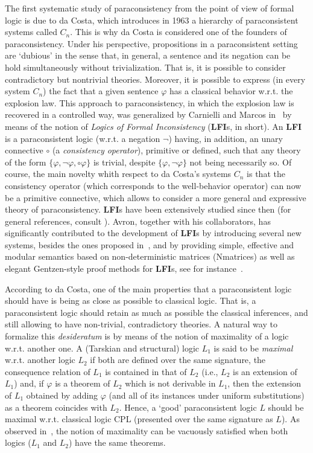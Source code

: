 \documentclass{article}
\theoremstyle{definition}
\begin{document}
The first systematic study of paraconsistency from the point of view of formal logic is due to da Costa, which introduces in 1963 a hierarchy of paraconsistent systems called $C_n$. This is why da Costa is considered one of the founders of paraconsistency. Under his perspective, propositions in a paraconsistent setting are `dubious' in the sense that, in general, a sentence and its negation can be hold simultaneously without trivialization. That is, it is possible to consider contradictory but nontrivial theories. Moreover,  it is possible to express (in every  system $C_n$) the fact that a given sentence $\varphi$ has a classical behavior w.r.t. the explosion law.
This approach to paraconsistency, in which the explosion law is recovered in a controlled way, was generalized by Carnielli and Marcos in~\cite{car:01} by means of the notion of {\em Logics of Formal Inconsistency} ({\bf LFI}s, in short). An {\bf LFI} is a paraconsistent logic (w.r.t. a negation $\neg$) having, in addition, an unary connective $\circ$ (a {\em consistency operator}), primitive or defined, such that any theory of the form $\{\varphi, \neg\varphi, {\circ}\varphi\}$ is trivial, despite $\{\varphi, \neg\varphi\}$ not being necessarily so. Of course, the main novelty whith respect to da Costa's systems $C_n$ is that the  consistency operator (which corresponds to the well-behavior operator) can now be a primitive connective, which allows to consider a more general and expressive theory of paraconsistency.
{\bf LFI}s have been extensively studied since then (for general references, consult  \cite{car:01,CCM,CC16}). Avron, together with his collaborators, has significantly contributed  to the development of {\bf LFI}s by introducing several new systems, besides the ones proposed in~\cite{car:01,CCM,CC16}, and by providing simple, effective and modular semantics based on non-deterministic matrices (Nmatrices) as well as elegant Gentzen-style proof methods for {\bf LFI}s, see for instance~\cite{ArieliAvron,ArieliAZ10,ArieliAZ11,ArieliAZ11a,AAZbook,Avr:05,Avr:07,Avr:09,Avron17,Avron19,AvronAZ10,avr:lev:01,avr:zam:11}.

According to da Costa, one of the main properties that a paraconsistent logic should have is being as close as possible to classical logic. That is,  a paraconsistent logic should retain as much as possible the classical inferences, and still allowing to have non-trivial, contradictory theories. A natural way to formalize this {\em desideratum} is by means of the notion of maximality of a logic w.r.t. another one. A (Tarskian and structural) logic $L_1$ is said to be {\em maximal} w.r.t. another logic $L_2$ if  both are
defined over the same signature, the consequence relation of $L_1$ is contained in that of $L_2$ (i.e., $L_2$ is an extension of $L_1$) and,  if $\varphi$  is a theorem of $L_2$ which is not derivable in $L_1$,  then the extension of $L_1$ obtained by adding $\varphi$ (and  all of its instances under uniform substitutions) as a theorem coincides with $L_2$. Hence, a `good' paraconsistent logic $L$ should be maximal w.r.t. classical logic CPL (presented over the same signature as $L$). As observed in~\cite{CoEsGiGo}, the notion of maximality can be vacuously satisfied when both logics ($L_1$ and $L_2$) have the same theorems.
\end{document}
